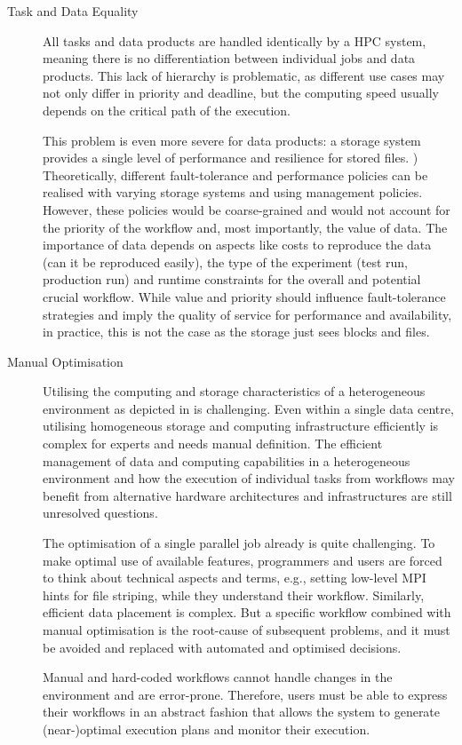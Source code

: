 \documentclass[a4paper]{article}
\begin{document}
\begin{description}
\item[Task and Data Equality]

All tasks and data products are handled identically by a HPC system, meaning there is no differentiation between individual jobs and data products.
This lack of hierarchy is problematic, as different use cases may not only differ in priority and deadline, but the computing speed usually depends on the critical path of the execution.

This problem is even more severe for data products: a storage system provides a single level of performance and resilience \sout{{\color{blue}{and performance}}} for stored files.
\sout{{\color{blue}{files}}} {\color{cyan}{datasets}})
Theoretically, different fault-tolerance and performance policies can be realised with varying storage systems and using management policies.
However, these policies would be coarse-grained and would not account for the priority of the workflow and, most importantly, the value of data.
The importance of data depends on aspects like costs to reproduce the data (can it be reproduced easily), the type of the experiment (test run, production run) and runtime constraints for the overall and potential crucial workflow.
While value and priority should influence fault-tolerance strategies and imply the quality of service for performance and availability, in practice, this is not the case as the storage just sees blocks and files. {\color{cyan}{I don't think we will be dealing with that in the next 10 years!}}

\item[Manual Optimisation]

Utilising the computing and storage characteristics of a heterogeneous environment as depicted in  is challenging.
Even within a single data centre, utilising homogeneous storage and computing infrastructure efficiently is complex for experts and needs manual definition.
The efficient management of data and computing capabilities in a heterogeneous environment and
how the execution of individual tasks from workflows may benefit from alternative hardware architectures and infrastructures
are still unresolved questions.

The optimisation of a single parallel job already is quite challenging.
To make optimal use of available features, programmers and users are forced to think about technical aspects and terms, e.g., setting low-level MPI hints for file striping, while they understand their workflow.
Similarly, efficient data placement is complex. But a specific workflow combined with manual optimisation is the root-cause of subsequent problems, and it must be avoided and replaced with automated and optimised decisions.

Manual and hard-coded workflows cannot handle changes in the environment and are error-prone.
Therefore, users must be able to express their workflows in an abstract fashion that allows the system to generate (near-)optimal execution plans and monitor their execution.

\end{description}
\end{document}
